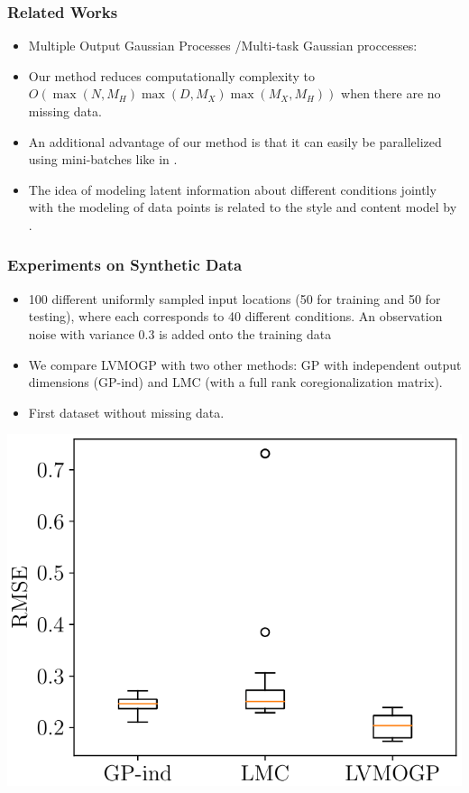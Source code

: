 \documentclass[aspectratio=169]{beamer}
\begin{document}
      \begin{frame}
    \frametitle{Related Works}
    \begin{itemize}
    \item Multiple Output Gaussian Processes /Multi-task Gaussian proccesses: \citet{Alvarez2012}  \citep{Goovaerts1997}  \citep{Bonilla2007}
    \item Our method reduces
computationally complexity to $O(\max(N,M_H)\max(D,M_X)\max(M_X,M_H))$ when there are no missing data.
\item An additional advantage of our method is that it can easily be parallelized using mini-batches like in \citep{HensmanEtAl2016}.
\item The idea of modeling latent information about different conditions jointly with the modeling of data points is related to the style and content model by \cite{TenenbaumFree2000}.
  \end{itemize}
  \end{frame}
  
      \begin{frame}
    \frametitle{Experiments on Synthetic Data}
    \begin{itemize}
    \item 100 different uniformly sampled input locations (50 for training and 50 for testing), where each corresponds to 40 different conditions. An observation noise with variance 0.3 is added onto the training data
    \item We compare LVMOGP with two other methods: GP with independent output dimensions (GP-ind) and LMC (with a full rank coregionalization matrix).
\item First dataset without missing data.

  \end{itemize}
      \begin{center}
          \includegraphics[width=.3\linewidth]{syn_results}
     \end{center}
  \end{frame}
\end{document}
